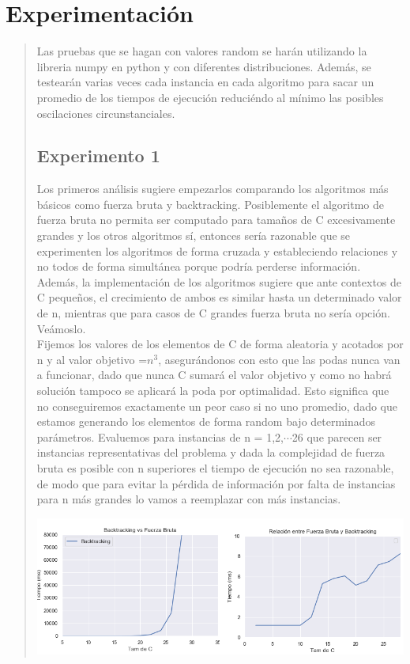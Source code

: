 \documentclass[7pt,a4paper]{article}
\begin{document}
\section{Experimentación}
\begin{verse}
Las pruebas que se hagan con valores random se harán utilizando la libreria numpy en python y con diferentes distribuciones. Además, se testearán varias veces cada instancia en cada algoritmo para sacar un promedio de los tiempos de ejecución reduciéndo al mínimo las posibles oscilaciones circunstanciales.
\\
\subsection{Experimento 1}

Los primeros análisis sugiere empezarlos comparando los algoritmos más básicos como fuerza bruta y backtracking. Posiblemente el algoritmo de fuerza bruta no permita ser computado para tamaños de C excesivamente grandes y los otros algoritmos sí, entonces sería razonable que se experimenten los algoritmos de forma cruzada y estableciendo relaciones y no todos de forma simultánea porque podría perderse información.
Además, la implementación de los algoritmos sugiere que ante contextos de C pequeños, el crecimiento de ambos es similar hasta un determinado valor de n, mientras que para casos de C grandes fuerza bruta no sería opción. Veámoslo.
\\
Fijemos los valores de los elementos de C de forma aleatoria y acotados por n y al valor objetivo =$n^{3}$, asegurándonos con esto que las podas nunca van a funcionar, dado que nunca C sumará el valor objetivo y como no habrá solución tampoco se aplicará la poda por optimalidad. Esto significa que no conseguiremos exactamente un peor caso si no uno promedio, dado que estamos generando los elementos de forma random bajo determinados parámetros. Evaluemos para instancias de n = 1,2,$\cdots$26 que parecen ser instancias representativas del problema y dada la complejidad de fuerza bruta es posible con n superiores el tiempo de ejecución no sea razonable, de modo que para evitar la pérdida de información por falta de instancias para n más grandes lo vamos a reemplazar con más instancias. \\
\begin{center}
\includegraphics[scale=.4]{wc_bf_graph.png}

\end{center}
\end{verse}
\end{document}
